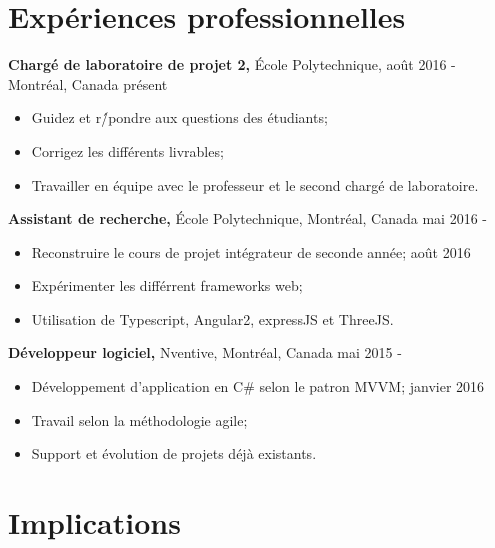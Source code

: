\documentclass[margin]{res}
\begin{document}
\begin{resume}
  \section{Exp\'{e}riences professionnelles}

  {\bf Charg\'e de laboratoire de projet 2,} \'Ecole Polytechnique, \hfill ao\^ut 2016 -
  \\Montr\'{e}al, Canada \hfill pr\'{e}sent
  \begin{itemize} \itemsep -2pt  %
  \item Guidez et r\'/pondre aux questions des \'etudiants;
  \item Corrigez les diff\'erents livrables;
  \item Travailler en \'equipe avec le professeur et le second charg\'e de laboratoire.
  \end{itemize}

  {\bf Assistant de recherche,} \'Ecole Polytechnique, Montr\'{e}al, Canada \hfill mai 2016 -
  \begin{itemize} \itemsep -2pt  %
  \item Reconstruire le cours de projet int\'egrateur de seconde ann\'ee; \hfill ao\^ut 2016
  \item Exp\'erimenter les diff\'errent frameworks web;
  \item Utilisation de Typescript, Angular2, expressJS et ThreeJS.
  \end{itemize}

  {\bf D\'eveloppeur logiciel,} Nventive, Montr\'{e}al, Canada \hfill mai 2015 -
  \begin{itemize} \itemsep -2pt  %
  \item D\'eveloppement d'application en C\# selon le patron MVVM; \hfill janvier 2016
  \item Travail selon la m\'ethodologie agile;
  \item Support et \'evolution de projets d\'ej\`a existants.
  \end{itemize}


  \section{Implications}


\end{resume}
\end{document}
